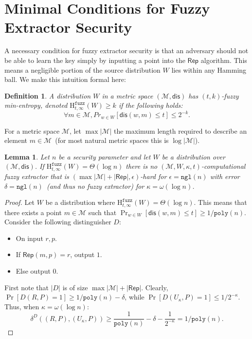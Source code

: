 \documentclass[11pt]{article}
\newcommand{\class}[1]{{\ensuremath{\mathsf{#1}}}}
\newcommand{\rep}{\ensuremath{\class{Rep}}\xspace}
\newcommand{\dis}{\ensuremath{\mathsf{dis}}}
\newcommand{\poly}{\ensuremath{\mathtt{poly}}\xspace}
\newcommand{\ngl}{\ensuremath{\mathtt{ngl}}\xspace}
\newcommand{\Hfuzz}{\mathrm{H}^{\mathtt{fuzz}}_{t,\infty}}
\newtheorem{lemma}[theorem]{Lemma}
\newtheorem{definition}[theorem]{Definition}
\begin{document}
\section{Minimal Conditions for Fuzzy Extractor Security}
\label{sec:minimal conditions}

A necessary condition for fuzzy extractor security is that an adversary should not be able to learn the key simply by inputting a point into the \rep algorithm.  This means a negligible portion of the source distribution $W$ lies within any Hamming ball.  We make this intuition formal here:

\begin{definition}
\label{def:fuzzy min-ent}
A distribution $W$ in a metric space $(\mathcal{M}, \dis)$ has $(t, k)$-fuzzy min-entropy, denoted $\Hfuzz(W) \ge k$ if the following holds:
\[
\forall m\in \mathcal{M}, Pr_{w\in W}[\dis(w, m) \leq t] \leq 2^{-k}.
\]
\end{definition}
For a metric space $\mathcal{M}$, let $\max |\mathcal{M}|$ the maximum length required to describe an element $m\in\mathcal{M}$~(for most natural metric spaces this is $\log |\mathcal{M}|$).
\begin{lemma}
\label{lem:fuzz necessary}
Let $n$ be a security parameter and let $W$ be a distribution over $(\mathcal{M}, \dis)$.
If $\Hfuzz (W) = \Theta(\log n)$ there is no $(\mathcal{M}, W, \kappa, t)$-computational fuzzy extractor that is $(\max |\mathcal{M}| +  |\rep|, \epsilon)$-hard for $\epsilon = \ngl(n)$ with error $\delta = \ngl(n)$~(and thus no fuzzy extractor) for $\kappa =\omega(\log n)$.
\end{lemma}
\begin{proof}
Let $W$ be a distribution where $\Hfuzz(W) = \Theta(\log n)$.  This means that there exists a point $m\in \mathcal{M}$ such that $\Pr_{w\in W}[\dis (w, m)\leq t] \geq 1/\poly(n)$.  Consider the following distinguisher $D$:
\begin{itemize}
\item On input $r, p$.
\item If $\rep(m, p) = r$, output $1$.
\item Else output $0$.
\end{itemize}
First note that $|D|$ is of size $\max |\mathcal{M}|+ |\rep|$.  Clearly, $\Pr[D(R, P) = 1]\geq 1/\poly(n) - \delta$, while $\Pr[D(U_\kappa, P)=1 ]\leq 1/2^{-\kappa}$.  Thus, when $\kappa = \omega(\log n)$:
\[
\delta^D((R, P), (U_\kappa, P))\geq \frac{1}{\poly(n)} -\delta -  \frac{1}{2^{-\kappa}} = 1/\poly(n).
\]
\end{proof}
\end{document}
